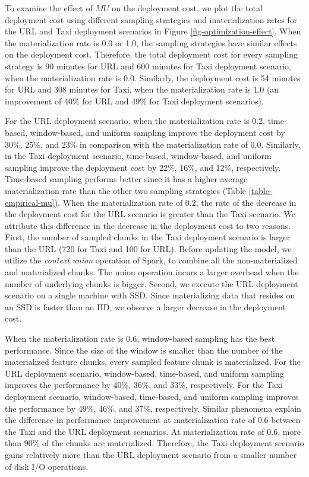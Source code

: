 To examine the effect of $MU$ on the deployment cost, we plot the total deployment cost using different sampling strategies and materialization rates for the URL and Taxi deployment scenarios in Figure \ref{fig-optimization-effect}.
When the materialization rate is 0.0 or 1.0, the sampling strategies have similar effects on the deployment cost. 
Therefore, the total deployment cost for every sampling strategy is 90 minutes for URL and 600 minutes for Taxi deployment scenario, when the materialization rate is 0.0.
Similarly, the deployment cost is 54 minutes for URL and 308 minutes for Taxi, when the materialization rate is 1.0 (an improvement of 40\% for URL and 49\% for Taxi deployment scenarios).

For the URL deployment scenario, when the materialization rate is 0.2, time-based, window-based, and uniform sampling improve the deployment cost by 30\%, 25\%, and 23\% in comparison with the materialization rate of 0.0.
Similarly, in the Taxi deployment scenario, time-based, window-based, and uniform sampling improve the deployment cost by 22\%, 16\%, and 12\%, respectively. 
Time-based sampling performs better since it has a higher average materialization rate than the other two sampling strategies (Table \ref{table-empirical-mu}).
When the materialization rate of 0.2, the rate of the decrease in the deployment cost for the URL scenario is greater than the Taxi scenario.
We attribute this difference in the decrease in the deployment cost to two reasons.
First, the number of sampled chunks in the Taxi deployment scenario is larger than the URL (720 for Taxi and 100 for URL).
Before updating the model, we utilize the \textit{context.union} operation of Spark, to combine all the non-materialized and materialized chunks.
The union operation incurs a larger overhead when the number of underlying chunks is bigger.
Second, we execute the URL deployment scenario on a single machine with SSD.
Since materializing data that resides on an SSD is faster than an HD, we observe a larger decrease in the deployment cost.

When the materialization rate is 0.6, window-based sampling has the best performance.
Since the size of the window is smaller than the number of the materialized feature chunks, every sampled feature chunk is materialized.
For the URL deployment scenario, window-based, time-based, and uniform sampling improves the performance by 40\%, 36\%, and 33\%, respectively.
For the Taxi deployment scenario, window-based, time-based, and uniform sampling improves the performance by 49\%, 46\%, and 37\%, respectively.
Similar phenomena explain the difference in performance improvement at materialization rate of 0.6 between the Taxi and the URL deployment scenarios.
At materialization rate of 0.6, more than 90\% of the chunks are materialized.
Therefore, the Taxi deployment scenario gains relatively more than the URL deployment scenario from a smaller number of disk I/O operations.

